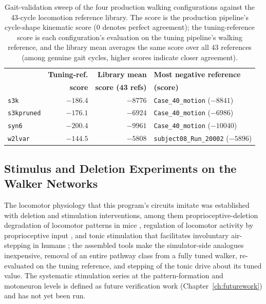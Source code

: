 \begin{table}[htbp]
\caption{Gait-validation sweep of the four production walking configurations against the 43-cycle locomotion reference library. The score is the production pipeline's cycle-shape kinematic score (0 denotes perfect agreement); the tuning-reference score is each configuration's evaluation on the tuning pipeline's walking reference, and the library mean averages the same score over all 43 references (among genuine gait cycles, higher scores indicate closer agreement).}
\label{tab:gait_sweep}
\begin{tabular}{@{}lrrl@{}}
\toprule
 & \textbf{Tuning-ref.} & \textbf{Library mean} & \textbf{Most negative reference} \\
 & \textbf{score} & \textbf{score (43 refs)} & \textbf{(score)} \\
\midrule
\texttt{s3k}        & $-186.4$ & $-8776$ & \texttt{Case\_40\_motion} ($-8841$) \\
\texttt{s3kpruned}  & $-176.1$ & $-6924$ & \texttt{Case\_40\_motion} ($-6986$) \\
\texttt{syn6}       & $-200.4$ & $-9961$ & \texttt{Case\_40\_motion} ($-10040$) \\
\texttt{w2lvar}     & $-144.5$ & $-5808$ & \texttt{subject08\_Run\_20002} ($-5896$) \\
\bottomrule
\end{tabular}
\end{table}

\subsection{Stimulus and Deletion Experiments on the Walker Networks}\label{sec:walker_variant_results}

The locomotor physiology that this program's circuits imitate was established with deletion and stimulation interventions, among them proprioceptive-deletion degradation of locomotor patterns in mice \citep{akay_degradation_2014}, regulation of locomotor activity by proprioceptive input \citep{lam_role_2002}, and tonic stimulation that facilitates involuntary air-stepping in humans \citep{selionov_tonic_2009}; the assembled tools make the simulator-side analogues inexpensive, removal of an entire pathway class from a fully tuned walker, re-evaluated on the tuning reference, and stepping of the tonic drive about its tuned value. The systematic stimulation series at the pattern-formation and motoneuron levels is defined as future verification work (Chapter~\ref{ch:futurework}) and has not yet been run.

